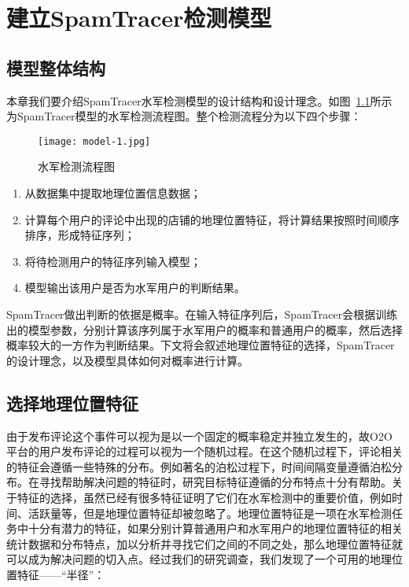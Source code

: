 
\chapter{建立SpamTracer检测模型}
\label{chap:model}


\section{模型整体结构}

本章我们要介绍SpamTracer水军检测模型的设计结构和设计理念。如图~\ref{fig:structure}所示为SpamTracer模型的水军检测流程图。整个检测流程分为以下四个步骤：

\begin{figure}[htbp]
	\centering
	\begin{minipage}[htbp]{\textwidth}
		\centering
		\texttt{[image: model-1.jpg]}
		\caption[水军检测流程图]
		{水军检测流程图\label{fig:structure}}		
	\end{minipage}     
\end{figure}

\begin{enumerate}
	\item[(1)] 从数据集中提取地理位置信息数据；
	\item[(2)] 计算每个用户的评论中出现的店铺的地理位置特征，将计算结果按照时间顺序排序，形成特征序列；
	\item[(3)] 将待检测用户的特征序列输入模型；
	\item[(4)] 模型输出该用户是否为水军用户的判断结果。
\end{enumerate}

SpamTracer做出判断的依据是概率。在输入特征序列后，SpamTracer会根据训练出的模型参数，分别计算该序列属于水军用户的概率和普通用户的概率，然后选择概率较大的一方作为判断结果。下文将会叙述地理位置特征的选择，SpamTracer的设计理念，以及模型具体如何对概率进行计算。


\section{选择地理位置特征}

由于发布评论这个事件可以视为是以一个固定的概率稳定并独立发生的，故O2O平台的用户发布评论的过程可以视为一个随机过程。在这个随机过程下，评论相关的特征会遵循一些特殊的分布。例如著名的泊松过程下，时间间隔变量遵循泊松分布。在寻找帮助解决问题的特征时，研究目标特征遵循的分布特点十分有帮助。关于特征的选择，虽然已经有很多特征证明了它们在水军检测中的重要价值，例如时间、活跃量等，但是地理位置特征却被忽略了。地理位置特征是一项在水军检测任务中十分有潜力的特征，如果分别计算普通用户和水军用户的地理位置特征的相关统计数据和分布特点，加以分析并寻找它们之间的不同之处，那么地理位置特征就可以成为解决问题的切入点。经过我们的研究调查，我们发现了一个可用的地理位置特征——“半径”：


